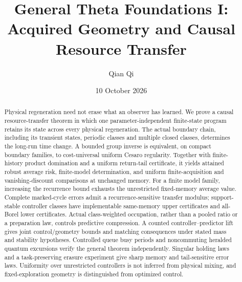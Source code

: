 \documentclass[11pt]{amsart}
\title{General Theta Foundations I: Acquired Geometry and Causal Resource Transfer}
\author{Qian Qi}\date{10 October 2026}
\theoremstyle{definition}\newtheorem{definition}[theorem]{Definition}
\theoremstyle{remark}\newtheorem{remark}[theorem]{Remark}
\begin{document}
\begin{abstract}
Physical regeneration need not erase what an observer has learned. We prove a causal resource-transfer theorem in which one parameter-independent finite-state program retains its state across every physical regeneration. The actual boundary chain, including its transient states, periodic classes and multiple closed classes, determines the long-run time change. A bounded group inverse is equivalent, on compact boundary families, to cost-universal uniform Cesaro regularity. Together with finite-history product domination and a uniform return-tail certificate, it yields attained robust average risk, finite-model determination, and uniform finite-acquisition and vanishing-discount comparisons at unchanged memory. For a finite model family, increasing the recurrence bound exhausts the unrestricted fixed-memory average value. Complete marked-cycle errors admit a recurrence-sensitive transfer modulus; support-stable controller classes have implementable same-memory upper certificates and all-Borel lower certificates. Actual class-weighted occupation, rather than a pooled ratio or a preparation law, controls predictive compression. A counted controller--predictor lift gives joint control/geometry bounds and matching consequences under stated mass and stability hypotheses. Controlled queue busy periods and noncommuting heralded quantum excursions verify the general theorem independently. Singular holding laws and a task-preserving erasure experiment give sharp memory and tail-sensitive error laws. Uniformity over unrestricted controllers is not inferred from physical mixing, and fixed-exploration geometry is distinguished from optimized control.
\end{abstract}
\maketitle








\appendix


\end{document}
